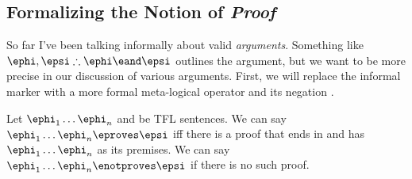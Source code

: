 \subsection{Formalizing the Notion of \emph{Proof}}

So far I've been talking informally about valid \emph{arguments}. Something
like $\ephi,\epsi\therefore\ephi\eand\epsi$ outlines the argument, but we
want to be more precise in our discussion of various arguments. First, we
will replace the informal \therefore marker with a more formal meta-logical
operator \eproves and its negation \enotproves.

\begin{definition}[Turnstiles]
  \label{def:turnstiles}
  Let $\ephi_1\dots\ephi_n$ and \epsi be TFL sentences. We can say
  $\ephi_1\dots\ephi_n\eproves\epsi$ iff there is a proof that ends in \epsi
  and has $\ephi_1\dots\ephi_n$ as its premises. We can say
  $\ephi_1\dots\ephi_n\enotproves\epsi$ if there is no such proof.
\end{definition}

